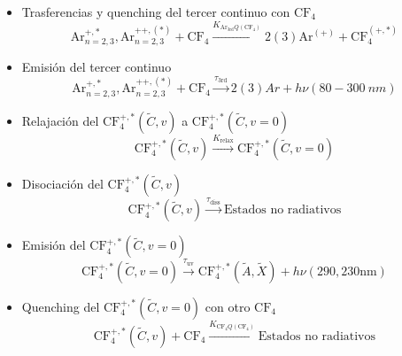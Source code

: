 \documentclass[12pt,a4paper]{article}
\newcommand{\Ar}{\mathrm{Ar}}
\newcommand{\CF}{\mathrm{CF}}
\newcommand{\third}{\mathrm{3rd}}
\begin{document}
\begin{itemize}
    \item  Trasferencias y quenching del tercer continuo con $\CF_4$
    \begin{equation}
        \Ar_{n=2,3}^{+,*},
        \Ar_{n=2,3}^{++,(*)} + \CF_4
        \xrightarrow{K_{\Ar_\third Q(\CF_4)}}  2(3) \Ar^{(+)} + \CF_4^{(+,*)}
    \end{equation}
    \item Emisión del tercer continuo
    \begin{equation}
        \Ar_{n=2,3}^{+,*},
        \Ar_{n=2,3}^{++,(*)} + \CF_4
        \xrightarrow{\tau_\third} 2(3) Ar + h \nu (80-\SI{300}{nm})
    \end{equation}
    \item Relajación del $\CF_4^{+,*}(\tilde{C},v)$ a  $\CF_4^{+,*}(\tilde{C},v=0)$
    \begin{equation}
         \CF_4^{+,*}(\tilde{C},v) \xrightarrow{K_{\mathrm{relax}}}  \CF_4^{+,*}(\tilde{C},v=0)
    \end{equation}
    \item Disociación del $\CF_4^{+,*}(\tilde{C},v)$ 
    \begin{equation}
         \CF_4^{+,*}(\tilde{C},v) \xrightarrow{\tau_{\mathrm{diss}}} \text{Estados no radiativos}
    \end{equation}
    \item Emisión del $\CF_4^{+,*}(\tilde{C},v=0)$ 
    \begin{equation}
         \CF_4^{+,*}(\tilde{C},v=0) \xrightarrow{\tau_{\mathrm{uv}}}  
         \CF_4^{+,*}(\tilde{A},\tilde{X}) + h \nu (290,230\mathrm{nm})
    \end{equation}
    \item Quenching del $\CF_4^{+,*}(\tilde{C},v=0)$ con otro $\CF_4$
    \begin{equation}
         \CF_4^{+,*}(\tilde{C},v) + \CF_4 \xrightarrow{K_{\CF_4 Q(\CF_4)}} \text{Estados no radiativos}
    \end{equation}
\end{itemize}
\end{document}
